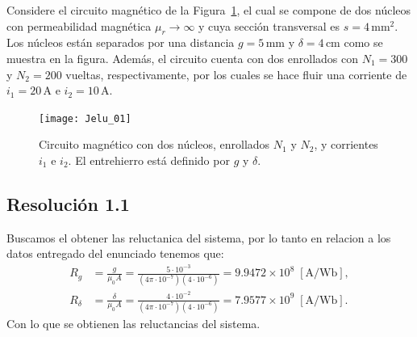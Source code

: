 \documentclass[
  11pt,
  letterpaper,
   addpoints,
  ]{exam}
\begin{document}
\begin{questions}
    \question  Considere el circuito magnético de la Figura~\ref{fig:circuito-magnetico}, el cual se compone de dos núcleos con permeabilidad magnética $\mu_r \to \infty$ y cuya sección transversal es $s = 4\,\mathrm{mm^2}$. Los núcleos están separados por una distancia $g = 5\,\mathrm{mm}$ y $\delta = 4\,\mathrm{cm}$ como se muestra en la figura. Además, el circuito cuenta con dos enrollados con $N_1 = 300$ y $N_2 = 200$ vueltas, respectivamente, por los cuales se hace fluir una corriente de $i_1 = 20\,\mathrm{A}$ e $i_2 = 10\,\mathrm{A}$.

\begin{figure}[H]
  \centering
    \texttt{[image: Jelu\_01]}
  \caption{Circuito magnético con dos núcleos, enrollados $N_1$ y $N_2$, y corrientes $i_1$ e $i_2$. El entrehierro está definido por $g$ y $\delta$.}
  \label{fig:circuito-magnetico}
\end{figure}

\begin{solution}

\subsection*{Resolución 1.1}
Buscamos el obtener las reluctanica del sistema, por lo tanto en relacion a los datos entregado del enunciado tenemos que: 
\begin{align}
R_g &= \frac{g}{\mu_0 A}
     = \frac{5\cdot10^{-3}}{(4\pi\cdot10^{-7})(4\cdot10^{-6})}
     = 9.9472\times10^{8}\;[\text{A/Wb}], \\
R_\delta &= \frac{\delta}{\mu_0 A}
     = \frac{4\cdot10^{-2}}{(4\pi\cdot10^{-7})(4\cdot10^{-6})}
     = 7.9577\times10^{9}\;[\text{A/Wb}].
\end{align}
Con lo que se obtienen las reluctancias del sistema.

\end{solution}
\end{questions}
\end{document}
